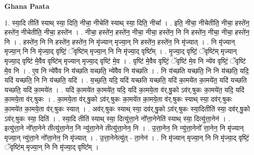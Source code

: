 \documentclass[17pt]{extarticle}
\begin{document}
\textbf{Ghana Paata } \newline

1. स्या॒दि तीति॑ स्याथ् स्या॒ दिति॒ नीचा॒ नीचेति॑ स्याथ् स्या॒ दिति॒ नीचा᳚ । . इति॒ नीचा॒ नीचेतीति॒ नीचा॒ हस्ते॑न॒ हस्ते॑न॒ नीचेतीति॒ नीचा॒ हस्ते॑न । . नीचा॒ हस्ते॑न॒ हस्ते॑न॒ नीचा॒ नीचा॒ हस्ते॑न॒ नि नि हस्ते॑न॒ नीचा॒ नीचा॒ हस्ते॑न॒ नि । . हस्ते॑न॒ नि नि हस्ते॑न॒ हस्ते॑न॒ नि मृ॑ज्यान् मृज्या॒न् नि हस्ते॑न॒ हस्ते॑न॒ नि मृ॑ज्यात् । . नि मृ॑ज्यान् मृज्या॒न् नि नि मृ॑ज्या॒द् वृष्टिं॒ ॅवृष्टि॑म् मृज्या॒न् नि नि मृ॑ज्या॒द् वृष्टि᳚म् । . मृ॒ज्या॒द् वृष्टिं॒ ॅवृष्टि॑म् मृज्यान् मृज्या॒द् वृष्टि॑ मे॒वैव वृष्टि॑म् मृज्यान् मृज्या॒द् वृष्टि॑ मे॒व । . वृष्टि॑ मे॒वैव वृष्टिं॒ ॅवृष्टि॑ मे॒व नि न्ये॑व वृष्टिं॒ ॅवृष्टि॑ मे॒व नि । . ए॒व नि न्ये॑वैव नि य॑च्छति यच्छति॒ न्ये॑वैव नि य॑च्छति । . नि य॑च्छति यच्छति॒ नि नि य॑च्छति॒ यदि॒ यदि॑ यच्छति॒ नि नि य॑च्छति॒ यदि॑ । . य॒च्छ॒ति॒ यदि॒ यदि॑ यच्छति यच्छति॒ यदि॑ का॒मये॑त का॒मये॑त॒ यदि॑ यच्छति यच्छति॒ यदि॑ का॒मये॑त । . यदि॑ का॒मये॑त का॒मये॑त॒ यदि॒ यदि॑ का॒मये॒ता व॑र्.षु॒को ऽव॑र्.षुकः का॒मये॑त॒ यदि॒ यदि॑ का॒मये॒ता व॑र्.षुकः । . का॒मये॒ता व॑र्.षु॒को ऽव॑र्.षुकः का॒मये॑त का॒मये॒ता व॑र्.षुकः स्याथ् स्या॒ दव॑र्.षुकः का॒मये॑त का॒मये॒ता व॑र्.षुकः स्यात् । . अव॑र्.षुकः स्याथ् स्या॒ दव॑र्.षु॒को ऽव॑र्.षुकः स्या॒दितीति॑ स्या॒ दव॑र्.षु॒को ऽव॑र्.षुकः स्या॒ दिति॑ । . स्या॒दि तीति॑ स्याथ् स्या॒ दित्यु॑त्ता॒ने नो᳚त्ता॒नेनेति॑ स्याथ् स्या॒ दित्यु॑त्ता॒नेन॑ । . इत्यु॑त्ता॒ने नो᳚त्ता॒नेने तीत्यु॑त्ता॒नेन॒ नि न्यु॑त्ता॒नेने तीत्यु॑त्ता॒नेन॒ नि । . उ॒त्ता॒नेन॒ नि न्यु॑त्ता॒नेनो᳚ त्ता॒नेन॒ नि मृ॑ज्यान् मृज्या॒न् न्यु॑त्ता॒ने नो᳚त्ता॒नेन॒ नि मृ॑ज्यात् । . उ॒त्ता॒नेनेत्यु॑त् - ता॒नेन॑ । . नि मृ॑ज्यान् मृज्या॒न् नि नि मृ॑ज्या॒द् वृष्टिं॒ ॅवृष्टि॑म् मृज्या॒न् नि नि मृ॑ज्या॒द् वृष्टि᳚म् । \newline
\end{document}
